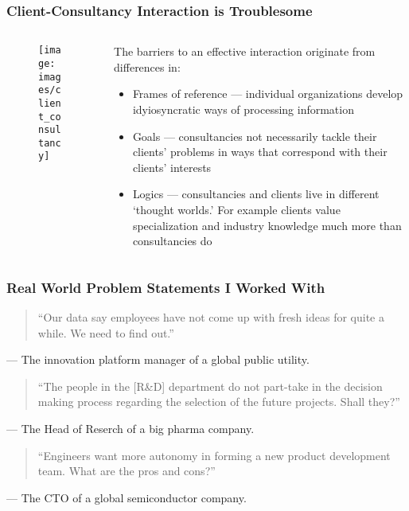 \documentclass[notes, aspectratio=1610]{beamer}
\begin{document}
\begin{frame}
	\frametitle{Client-Consultancy Interaction is Troublesome}
	\small
	\begin{columns}
		\begin{column}{0.5\textwidth}
			\begin{figure}
				\begin{center}
					\texttt{[image: images/client\_consultancy]}
				\end{center}
			\end{figure}
		\end{column}
		\begin{column}{0.5\textwidth}
			The barriers to an effective interaction originate from 
			differences in:
			\begin{itemize}
				\item Frames of reference --- individual organizations 
				develop idyiosyncratic ways of processing information
				\item Goals --- consultancies not necessarily 
				tackle their clients' problems in ways that 
				correspond with their clients' interests
				\item Logics --- consultancies and clients 
				live in different `thought worlds.' For example 
				clients value specialization and industry 
				knowledge much more than consultancies do
			\end{itemize}
		\end{column}
	\end{columns}
\end{frame}

\begin{frame}
	\frametitle{Real World Problem Statements I Worked With}
	\begin{quote}
		``Our data say employees have not come up with 
		fresh ideas for quite a while. We need to find out.''
	\end{quote}
	\raggedleft --- The innovation platform manager of a global public utility.

	\vspace{1em}

	\begin{quote}
		``The people in the [R\&D] department do not part-take in 
		the decision making process regarding the selection 
		of the future projects. Shall they?''
	\end{quote}
	\raggedleft --- The Head of Reserch of a big pharma company.
	\vspace{1em}

	\begin{quote}
		``Engineers want more autonomy in forming a new product 
		development team. What are the pros and cons?''
	\end{quote}
	\raggedleft --- The CTO of a global semiconductor company.
	
\end{frame}
\end{document}
